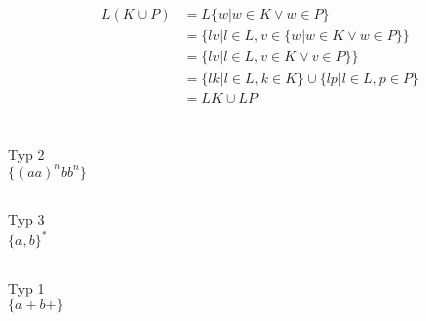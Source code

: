\documentclass{article}
\begin{document}
\subsection{}
\begin{align*}
    L(K \cup P) &= L\{w | w\in K\lor w\in P\}\\
    &= \{lv | l\in L, v\in\{w | w\in K\lor w\in P\}\}\\
    &= \{lv | l\in L, v\in K\lor v\in P\}\}\\
    &=\{lk | l\in L, k\in K\} \cup \{lp|l\in L, p\in P\}\\
    &=LK \cup LP
\end{align*}

\section{}
\subsection{}
Typ 2\\
$\{(aa)^nbb^n\}$
\subsection{}
Typ 3\\
$\{a,b\}^*$
\subsection{}
Typ 1\\
$\{a+b+\}$
\end{document}
